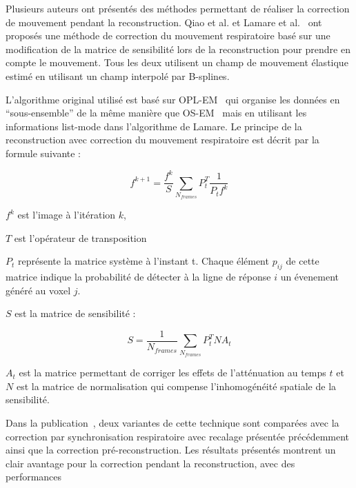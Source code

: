 Plusieurs auteurs ont présentés des méthodes permettant de réaliser la correction de mouvement pendant la reconstruction. Qiao et al.\cite{qiao2006motion} et Lamare et al.~\cite{lamare2007list} ont proposés une méthode de correction du mouvement respiratoire basé sur une modification de la matrice de sensibilité lors de la reconstruction pour prendre en compte le mouvement. Tous les deux utilisent un champ de mouvement élastique estimé en utilisant un champ interpolé par B-splines.

L'algorithme original utilisé est basé sur OPL-EM~\cite{reader2002one} qui organise les données en ``sous-ensemble'' de la même manière que OS-EM~\cite{hudson1994accelerated} mais en utilisant les informations list-mode dans l'algorithme de Lamare. Le principe de la reconstruction avec correction du mouvement respiratoire est décrit par la formule suivante :

\label{lab:corrMatSyst}
\begin{equation}
 f^{k+1}=\frac{f^k}{S} \sum_{N_{frames}} P_t^T \frac{1}{P_t f^k} 
\end{equation}

$f^k$ est l'image à l'itération $k$,

$T$ est l'opérateur de transposition

$P_t$ représente la matrice système à l'instant t. Chaque élément $p_{ij}$ de cette matrice indique la probabilité de détecter à la ligne de réponse $i$ un évenement généré au voxel $j$. 

$S$ est la matrice de sensibilité :

\begin{equation}
 S=\frac{1}{N_{frames}} \sum_{N_{frames}} P_t^T N A_t 
\end{equation}

 $A_t$ est la matrice permettant de corriger les effets de l'atténuation au temps $t$ et $N$ est la matrice de normalisation qui compense l'inhomogénéité spatiale de la sensibilité.

Dans la publication~\cite{lamare2007list}, deux variantes de cette technique sont comparées avec la correction par synchronisation respiratoire avec recalage présentée précédemment ainsi que la correction pré-reconstruction. Les résultats présentés montrent un clair avantage pour la correction pendant la reconstruction, avec des performances 


